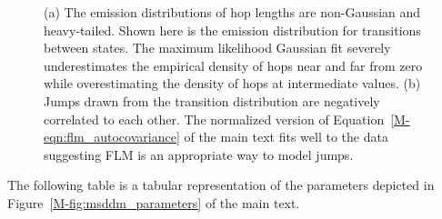\documentclass{article}
\begin{document}
\begin{figure}
\begin{subfigure}{0.42\textwidth}
  \caption{}\label{fig:msddm_acf}
  \end{subfigure}
  \caption{(a) The emission distributions of hop lengths are non-Gaussian and
	  heavy-tailed. Shown here is the emission distribution for transitions
	  between states. The maximum likelihood Gaussian fit severely
	  underestimates the empirical density of hops near and far from zero
	  while overestimating the density of hops at intermediate values. (b)
	  Jumps drawn from the transition distribution are negatively
	  correlated to each other. The normalized version of
	  Equation~\ref{M-eqn:flm_autocovariance} of the main text fits well to the data
	  suggesting FLM is an appropriate way to model jumps.}
	  \label{fig:msddm_emissions}
  \end{figure}
  
  The following table is a tabular representation of the parameters 
  depicted in Figure~\ref{M-fig:msddm_parameters} of the main text.
  
\end{document}
